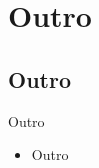 \section{Outro}
\subsection{Outro}
\begin{frame}{Outro}
  \begin{itemize}
    \item Outro
  \end{itemize}
\end{frame}
